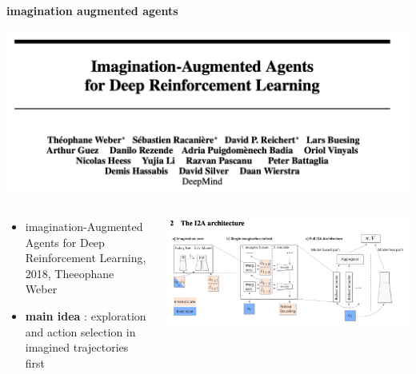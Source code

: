 \documentclass[xcolor=dvipsnames]{beamer}
\begin{document}
\begin{frame}{\bf imagination augmented agents}

  {\centering \includegraphics[scale=0.2]{../images/paper_imagination_0.png}}


  \begin{columns}

    \begin{column}{0.5\textwidth}
      \begin{itemize}
        \item imagination-Augmented Agents for Deep Reinforcement Learning, 2018, Theeophane Weber
        \item {\bf \color{red} main idea } : exploration and action selection in imagined trajectories first
      \end{itemize}
    \end{column}

    \begin{column}{0.5\textwidth}
      {\centering \includegraphics[scale=0.25]{../images/paper_imagination_1.png}}
    \end{column}

  \end{columns}


\end{frame}
\end{document}
